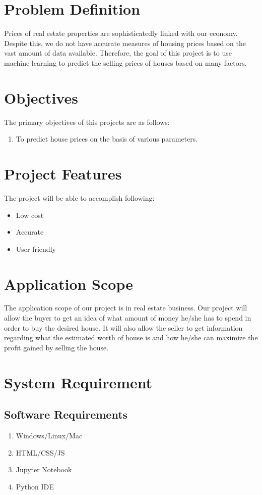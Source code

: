 \section{Problem Definition}
Prices of real estate properties are sophisticatedly linked with our economy. Despite this, we do not have accurate measures of housing prices based on the vast amount of data available. Therefore, the goal of this project is to use machine learning to predict the selling prices of houses based on many factors.
\section{Objectives}
The primary objectives of this projects are as follows:
\vspace{-18pt}
\begin{enumerate}[label=\roman*.]
\item To predict house prices on the basis of various parameters.
\end{enumerate}

\section{Project Features}
The project will be able to accomplish following:
\vspace{-18pt}
\begin{itemize}
\item Low cost
\item Accurate
\item User friendly 
\end{itemize}

\section{Application Scope}
The application scope of our project is in real estate business. Our project will allow the buyer to get an idea of what amount of money he/she has to spend in order to buy the desired house. It will also allow the seller to get information regarding what the estimated worth of house is and how he/she can maximize the profit gained by selling the house.

\section{System Requirement}
\vspace{-18pt}
\subsection{Software Requirements}
\vspace{-10pt}
\begin{enumerate}
\item[] Windows/Linux/Mac
\item[] HTML/CSS/JS
\item[] Jupyter Notebook
\item[] Python IDE
\end{enumerate}
